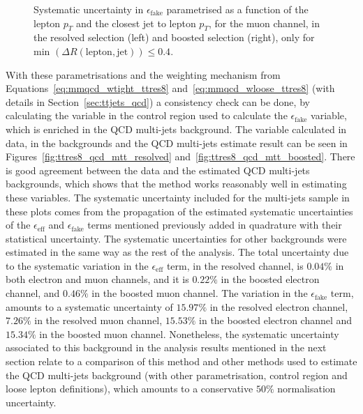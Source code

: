 \begin{figure}
\centering
{}
\caption{Systematic uncertainty in $\epsilon_{\mathrm{fake}}$ parametrised as a function of the lepton $p_T$ and the closest jet to lepton $p_T$, for the muon channel, in the resolved selection (left) and boosted selection (right), only for min $(\Delta R(\textrm{lepton}, \textrm{jet})) \leq 0.4$.}
\label{fig:ttres8_qcd_fake_mu_syst}
\end{figure}

With these parametrisations and the weighting mechanism from Equations~\ref{eq:mmqcd_wtight_ttres8} and~\ref{eq:mmqcd_wloose_ttres8}
(with details in Section~\ref{sec:ttjets_qcd}) a consistency check can be done, by calculating the \mtt variable in the control region used to calculate the
$\epsilon_{\mathrm{fake}}$ variable, which is enriched in the QCD multi-jets background.
The \mtt variable calculated in data, in the backgrounds and the QCD multi-jets estimate result can be seen in Figures~\ref{fig:ttres8_qcd_mtt_resolved}
and~\ref{fig:ttres8_qcd_mtt_boosted}. There is good agreement between the data and the estimated QCD multi-jets backgrounds, which shows that the method works reasonably well
in estimating these variables. The systematic uncertainty included for the multi-jets sample in these plots comes from the propagation
of the estimated systematic uncertainties of the $\epsilon_{\textrm{eff}}$ and $\epsilon_{\textrm{fake}}$ terms
mentioned previously added in quadrature with their statistical uncertainty. The systematic uncertainties for other backgrounds were estimated in the same way as the rest of
the analysis. The total uncertainty due to the systematic variation in the $\epsilon_{\textrm{eff}}$ term, in the resolved channel, is $0.04\%$ in both electron and muon
channels, and it is $0.22\%$ in the boosted electron channel, and $0.46\%$ in the boosted muon channel. The variation in the $\epsilon_{\textrm{fake}}$ term, amounts to
a systematic uncertainty of $15.97\%$ in the resolved electron channel, $7.26\%$ in the resolved muon channel, $15.53\%$ in the boosted electron channel and
$15.34\%$ in the boosted muon channel.
Nonetheless, the systematic uncertainty associated to this background in the analysis results mentioned in the next section relate to a
comparison of this method and other methods used to estimate the QCD multi-jets background (with other parametrisation, control region and loose lepton definitions),
which amounts to a conservative $50\%$ normalisation uncertainty.

